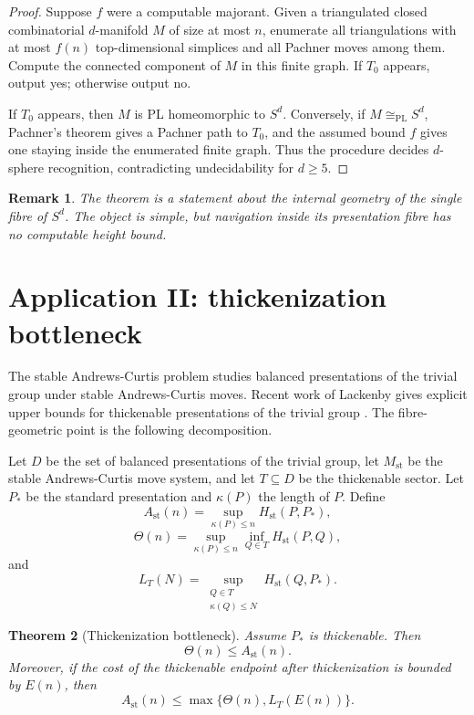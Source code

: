 \documentclass[11pt]{article}
\newtheorem{theorem}{Theorem}[section]
\newtheorem{remark}[theorem]{Remark}
\begin{document}
\begin{proof}
Suppose \(f\) were a computable majorant.  Given a triangulated closed combinatorial \(d\)-manifold \(M\) of size at most \(n\), enumerate all triangulations with at most \(f(n)\) top-dimensional simplices and all Pachner moves among them.  Compute the connected component of \(M\) in this finite graph.  If \(T_0\) appears, output yes; otherwise output no.

If \(T_0\) appears, then \(M\) is PL homeomorphic to \(S^d\).  Conversely, if \(M\cong_{\mathrm{PL}}S^d\), Pachner's theorem gives a Pachner path to \(T_0\), and the assumed bound \(f\) gives one staying inside the enumerated finite graph.  Thus the procedure decides \(d\)-sphere recognition, contradicting undecidability for \(d\ge5\).
\end{proof}

\begin{remark}
The theorem is a statement about the internal geometry of the single fibre of \(S^d\).  The object is simple, but navigation inside its presentation fibre has no computable height bound.
\end{remark}

\section{Application II: thickenization bottleneck}

The stable Andrews-Curtis problem studies balanced presentations of the trivial group under stable Andrews-Curtis moves.  Recent work of Lackenby gives explicit upper bounds for thickenable presentations of the trivial group \cite{lackenby2026}.  The fibre-geometric point is the following decomposition.

Let \(D\) be the set of balanced presentations of the trivial group, let \(M_{\mathrm{st}}\) be the stable Andrews-Curtis move system, and let \(T\subseteq D\) be the thickenable sector.  Let \(P_*\) be the standard presentation and \(\kappa(P)\) the length of \(P\).  Define
\[
A_{\mathrm{st}}(n)=
\sup_{\kappa(P)\le n}H_{\mathrm{st}}(P,P_*),
\]
\[
\Theta(n)=
\sup_{\kappa(P)\le n}\inf_{Q\in T}H_{\mathrm{st}}(P,Q),
\]
and
\[
L_T(N)=
\sup_{\substack{Q\in T\\ \kappa(Q)\le N}}H_{\mathrm{st}}(Q,P_*).
\]

\begin{theorem}[Thickenization bottleneck]
Assume \(P_*\) is thickenable.  Then
\[
\Theta(n)\le A_{\mathrm{st}}(n).
\]
Moreover, if the cost of the thickenable endpoint after thickenization is bounded by \(E(n)\), then
\[
A_{\mathrm{st}}(n)\le \max\{\Theta(n),L_T(E(n))\}.
\]
\end{theorem}
\end{document}

